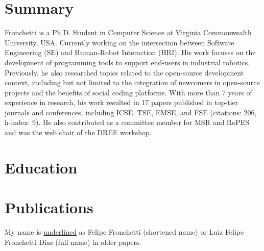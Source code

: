\documentclass[10pt]{extarticle}
\begin{document}
\createHeader
\section{Summary}
\small Fronchetti is a Ph.D. Student in Computer Science at Virginia Commonwealth University, USA. Currently working on the intersection between Software Engineering (SE) and Human-Robot Interaction (HRI). His work focuses on the development of programming tools to support end-users in industrial robotics. Previously, he also researched topics related to the open-source development context, including but not limited to the integration of newcomers in open-source projects and the benefits of social coding platforms. With more than 7 years of experience in research, his work resulted in 17 papers published in top-tier journals and conferences, including ICSE, TSE, EMSE, and FSE (citations: 206, h-index: 9). He also contributed as a committee member for MSR and RoPES and was the web chair of the DREE workshop.

\section{Education}
%
%
%

\section{Publications}
\footnotesize My name is \underline{underlined} as Felipe Fronchetti (shortened name) or Luiz Felipe Fronchetti Dias (full name) in older papers.
\end{document}
